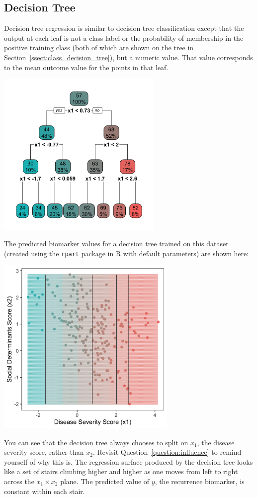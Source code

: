 \subsection{Decision Tree}

Decision tree regression is similar to decision tree classification except that the output at each leaf is not a class label or the probability of membership in the positive training class (both of which are shown on the tree in Section~\ref{ssect:class_decision_tree}), but a numeric value. That value corresponds to the mean outcome value for the points in that leaf. 
\vspace{-7mm}
\begin{center}
\includegraphics[width=0.6\textwidth]{img/esl-decision-tree-just-tree-reg.png}
\end{center}
\vspace{-7mm}
The predicted biomarker values for a decision tree trained on this dataset (created using the \texttt{rpart} package in R with default parameters) are shown here:
\begin{center}
\includegraphics[width=0.65\textwidth]{img/esl-reg-decision-tree.png}
\end{center}
You can see that the decision tree always chooses to split on $x_1$, the disease severity score, rather than $x_2$. Revisit Question~\ref{question:influence} to remind yourself of why this is. The regression surface produced by the decision tree looks like a set of stairs climbing higher and higher as one moves from left to right across the $x_1 \times x_2$ plane. The predicted value of $y$, the recurrence biomarker, is constant within each stair. 
\vspace{5mm}

